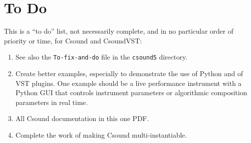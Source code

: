 \documentclass[10pt,letterpaper,onecolumn]{book}
\begin{document}
\section{To Do}

This is a ``to do'' list, not necessarily complete, and in no particular order of priority or time, for Csound and CsoundVST:

\begin{enumerate}
\item See also the \texttt{To-fix-and-do} file in the \texttt{csound5} directory.
\item Create better examples, especially to demonstrate the use of Python and of VST plugins. One example should be a live performance instrument with a Python GUI that controls instrument parameters or algorithmic composition parameters in real time.
\item All Csound documentation in this one PDF.
\item Complete the work of making Csound multi-instantiable.
\end{enumerate}



\end{document}
